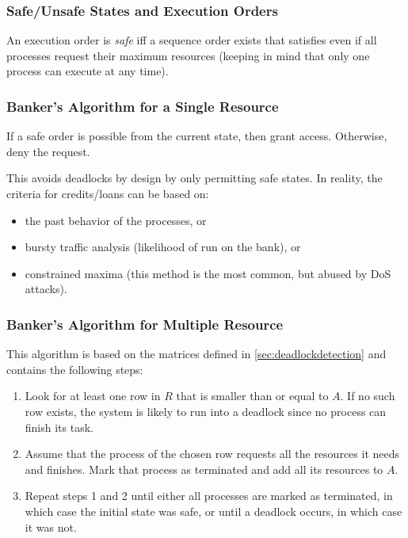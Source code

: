 			\subsubsection{Safe/Unsafe States and Execution Orders}
				An execution order is \textit{safe} iff a sequence order exists that satisfies even if all processes request their maximum resources (keeping in mind that only one process can execute at any time).

			\subsubsection{Banker's Algorithm for a Single Resource}
				If a safe order is possible from the current state, then grant access. Otherwise, deny the request.

				This avoids deadlocks by design by only permitting safe states. In reality, the criteria for credits/loans can be based on:
				\begin{itemize}
					\item the past behavior of the processes, or
					\item bursty traffic analysis (likelihood of run on the bank), or
					\item constrained maxima (this method is the most common, but abused by DoS attacks).
				\end{itemize}

			\subsubsection{Banker's Algorithm for Multiple Resource}
				This algorithm is based on the matrices defined in \ref{sec:deadlockdetection} and contains the following steps:
				\begin{enumerate}
					\item Look for at least one row in \(R\) that is smaller than or equal to \(A\). If no such row exists, the system is likely to run into a deadlock since no process can finish its task.
					\item Assume that the process of the chosen row requests all the resources it needs and finishes. Mark that process as terminated and add all its resources to \(A\).
					\item Repeat steps 1 and 2 until either all processes are marked as terminated, in which case the initial state was safe, or until a deadlock occurs, in which case it was not.
				\end{enumerate}

